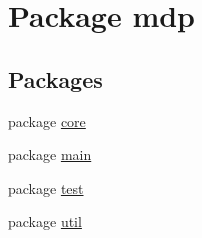 \hypertarget{namespacemdp}{}\section{Package mdp}
\label{namespacemdp}
\subsection*{Packages}
\begin{DoxyCompactItemize}
\item 
package \hyperlink{namespacemdp_1_1core}{core}
\item 
package \hyperlink{namespacemdp_1_1main}{main}
\item 
package \hyperlink{namespacemdp_1_1test}{test}
\item 
package \hyperlink{namespacemdp_1_1util}{util}
\end{DoxyCompactItemize}

